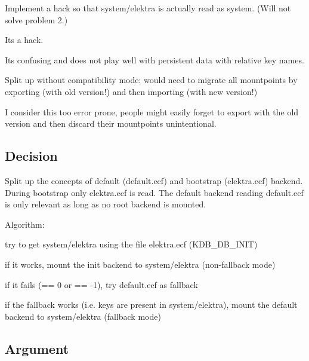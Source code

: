 \begin{DoxyItemize}
\item Implement a hack so that {\ttfamily system/elektra} is actually read as {\ttfamily system}. (Will not solve problem 2.)
\begin{DoxyItemize}
\item Its a hack.
\item Its confusing and does not play well with persistent data with relative key names.
\end{DoxyItemize}
\item Split up without compatibility mode\+: would need to migrate all mountpoints by exporting (with old version!) and then importing (with new version!)
\begin{DoxyItemize}
\item I consider this too error prone, people might easily forget to export with the old version and then discard their mountpoints unintentional.
\end{DoxyItemize}
\end{DoxyItemize}

\subsection*{Decision}

Split up the concepts of default ({\ttfamily default.\+ecf}) and bootstrap ({\ttfamily elektra.\+ecf}) backend. During bootstrap only {\ttfamily elektra.\+ecf} is read. The default backend reading {\ttfamily default.\+ecf} is only relevant as long as no root backend is mounted.

Algorithm\+:


\begin{DoxyEnumerate}
\item try to get system/elektra using the file elektra.\+ecf (K\+D\+B\+\_\+\+D\+B\+\_\+\+I\+N\+I\+T)
\item if it works, mount the init backend to system/elektra (non-\/fallback mode)
\item if it fails (== 0 or == -\/1), try default.\+ecf as fallback
\item if the fallback works (i.\+e. keys are present in system/elektra), mount the default backend to system/elektra (fallback mode)
\end{DoxyEnumerate}

\subsection*{Argument}


